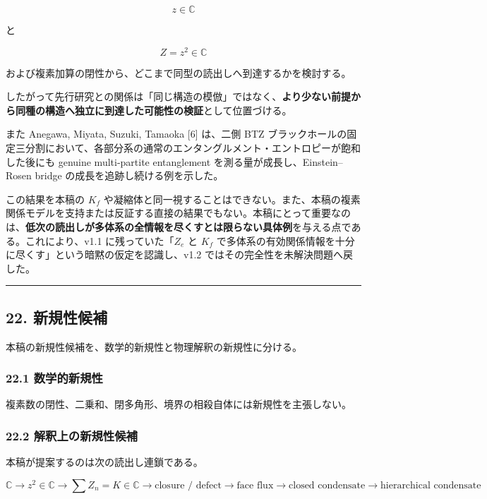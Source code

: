 \documentclass[
  a4paper,
]{ltjsarticle}
\begin{document}
\[
z\in\mathbb C
\]

と

\[
Z=z^2\in\mathbb C
\]

および複素加算の閉性から、どこまで同型の読出しへ到達するかを検討する。

したがって先行研究との関係は「同じ構造の模倣」ではなく、\textbf{より少ない前提から同種の構造へ独立に到達した可能性の検証}として位置づける。

また Anegawa, Miyata, Suzuki, Tamaoka {[}6{]} は、二側 BTZ
ブラックホールの固定三分割において、各部分系の通常のエンタングルメント・エントロピーが飽和した後にも
genuine multi-partite entanglement を測る量が成長し、Einstein--Rosen
bridge の成長を追跡し続ける例を示した。

この結果を本稿の \(K_f\)
や凝縮体と同一視することはできない。また、本稿の複素関係モデルを支持または反証する直接の結果でもない。本稿にとって重要なのは、\textbf{低次の読出しが多体系の全情報を尽くすとは限らない具体例}を与える点である。これにより、v1.1
に残っていた「\(Z_e\) と \(K_f\)
で多体系の有効関係情報を十分に尽くす」という暗黙の仮定を認識し、v1.2
ではその完全性を未解決問題へ戻した。

\begin{center}\rule{0.5\linewidth}{0.5pt}\end{center}

\subsection{22. 新規性候補}\label{ux65b0ux898fux6027ux5019ux88dc}

本稿の新規性候補を、数学的新規性と物理解釈の新規性に分ける。

\subsubsection{22.1
数学的新規性}\label{ux6570ux5b66ux7684ux65b0ux898fux6027}

複素数の閉性、二乗和、閉多角形、境界の相殺自体には新規性を主張しない。

\subsubsection{22.2
解釈上の新規性候補}\label{ux89e3ux91c8ux4e0aux306eux65b0ux898fux6027ux5019ux88dc}

本稿が提案するのは次の読出し連鎖である。

\[
\boxed{
\mathbb C
\to
z^2\in\mathbb C
\to
\sum Z_n=K\in\mathbb C
\to
\text{closure / defect}
\to
\text{face flux}
\to
\text{closed condensate}
\to
\text{hierarchical condensate}
}
\]
\end{document}

